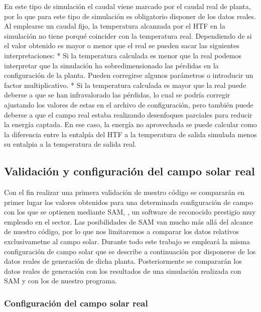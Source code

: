 En este tipo de simulación el caudal viene marcado por el caudal real de
planta, por lo que para este tipo de simulación es obligatorio disponer
de los datos reales. Al emplearse un caudal fijo, la temperatura
alcanzada por el HTF en la simulación no tiene porqué coincider con la
temperatura real. Dependiendo de si el valor obtenido es mayor o menor
que el real se pueden sacar las siguientes interpretaciones: * Si la
temperatura calculada es menor que la real podemos interpretar que la
simulación ha sobredimensionado las pérdidas en la configuración de la
planta. Pueden corregirse algunos parámetros o introducir un factor
multiplicativo. * Si la temperatura calculada es mayor que la real puede
deberse a que se han infravalorado las pérdidas, lo cual se podría
corregir ajustando los valores de estas en el archivo de configuración,
pero también puede deberse a que el campo real estaba realizando
desenfoques parciales para reducir la energía captada. En ese caso, la
energía no aprovechada se puede calcular como la diferencia entre la
entalpía del HTF a la temperatura de salida simulada menos su entalpia a
la temperatura de salida real.

    \hypertarget{validaciuxf3n-y-configuraciuxf3n-del-campo-solar-real}{%
\subsection{Validación y configuración del campo solar
real}\label{validaciuxf3n-y-configuraciuxf3n-del-campo-solar-real}}

Con el fin realizar una primera validación de nuestro código se
compararán en primer lugar los valores obtenidos para una determinada
configuración de campo con los que se optienen mediante SAM,
\cite{1022085/NBJ6NM3F}, un software de reconocido prestigio muy
empleado en el sector. Las posibilidades de SAM van mucho más allá del
alcance de nuestro código, por lo que nos limitaremos a comparar los
datos relativos exclusivametne al campo solar. Durante todo este trabajo
se empleará la misma configuración de campo solar que se describe a
continuación por disponerse de los datos reales de generación de dicha
planta. Posteriormente se compararán los datos reales de generación con
los resultados de una simulación realizada con SAM y con los de nuestro
programa.

\hypertarget{configuraciuxf3n-del-campo-solar-real}{%
\subsubsection{Configuración del campo solar
real}\label{configuraciuxf3n-del-campo-solar-real}}


